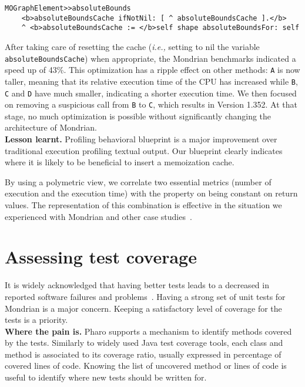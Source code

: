 \documentclass[runningheads]{llncs}
\newcommand{\ct}{\lstinline[backgroundcolor=\color{white},basicstyle=\footnotesize\ttfamily]}
\newcommand{\sd}[1]{\nb{SD}{orange}{#1}}
\newcommand{\ie}{\emph{i.e.,}\xspace}
\newcommand{\seclabel}[1]{\label{sec:#1}}
\newcommand{\myparagraph}[1]{\noindent \textbf{#1.}}
\begin{document}
\begin{lstlisting}
MOGraphElement>>absoluteBounds
	<b>absoluteBoundsCache ifNotNil: [ ^ absoluteBoundsCache ].</b>
	^ <b>absoluteBoundsCache := </b>self shape absoluteBoundsFor: self
\end{lstlisting}

After taking care of resetting the cache (\ie setting to nil the variable \ct{absoluteBoundsCache}) when appropriate, the Mondrian benchmarks indicated a speed up of 43\%. This optimization has a ripple effect on other methods: \ct{A} is now taller, meaning that its relative execution time of the CPU has increased while \ct{B}, \ct{C} and \ct{D} have much smaller, indicating a shorter execution time. We then focused on removing a suspicious call from \ct{B} to \ct{C}, which results in Version 1.352. At that stage, no much optimization is possible without significantly changing the architecture of Mondrian.\\

\myparagraph{Lesson learnt} Profiling behavioral blueprint is a major improvement over traditional execution profiling textual output. Our blueprint clearly indicates where it is likely to be beneficial to insert a memoization cache. 

By using a polymetric view, we correlate two essential metrics (number of execution and the execution time) with the property on being constant on return values. The representation of this combination is effective in the situation we experienced with Mondrian and other case studies~\cite{Berg11f}.



\section{Assessing test coverage} \seclabel{testblueprint}


It is widely acknowledged that having better tests leads to a decreased in reported software failures and problems~\cite{Mock09a}. Having a strong set of unit tests for Mondrian is a major concern. Keeping a satisfactory level of coverage for the tests is a priority. \\

\myparagraph{Where the pain is} 
Pharo supports a mechanism to identify methods covered by the tests. Similarly to widely used Java test coverage tools, each class and method is associated to its coverage ratio, usually expressed in percentage of covered lines of code. Knowing the list of uncovered method or lines of code is useful to identify where new tests should be written for. 
\end{document}
